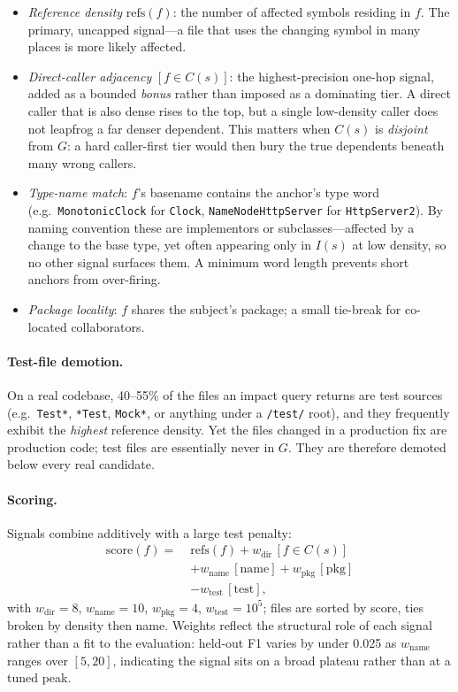 \documentclass[11pt,twocolumn]{article}
\begin{document}
\begin{itemize}
  \item \emph{Reference density} $\mathrm{refs}(f)$: the number of affected symbols residing in
  $f$. The primary, uncapped signal---a file that uses the changing symbol in many places is more
  likely affected.
  \item \emph{Direct-caller adjacency} $[f\in C(s)]$: the highest-precision one-hop signal, added
  as a bounded \emph{bonus} rather than imposed as a dominating tier. A direct caller that is also
  dense rises to the top, but a single low-density caller does not leapfrog a far denser
  dependent. This matters when $C(s)$ is \emph{disjoint} from $G$: a hard caller-first tier would
  then bury the true dependents beneath many wrong callers.
  \item \emph{Type-name match}: $f$'s basename contains the anchor's type word (e.g.\
  \texttt{MonotonicClock} for \texttt{Clock}, \texttt{NameNodeHttpServer} for
  \texttt{HttpServer2}). By naming convention these are implementors or subclasses---affected by a
  change to the base type, yet often appearing only in $I(s)$ at low density, so no other signal
  surfaces them. A minimum word length prevents short anchors from over-firing.
  \item \emph{Package locality}: $f$ shares the subject's package; a small tie-break for
  co-located collaborators.
\end{itemize}

\paragraph{Test-file demotion.} On a real codebase, 40--55\% of the files an impact query returns
are test sources (e.g.\ \texttt{Test*}, \texttt{*Test}, \texttt{Mock*}, or anything under a
\texttt{/test/} root), and they frequently exhibit the \emph{highest} reference density. Yet the
files changed in a production fix are production code; test files are essentially never in $G$.
They are therefore demoted below every real candidate.

\paragraph{Scoring.} Signals combine additively with a large test penalty:
\begin{align*}
\mathrm{score}(f) =\;& \mathrm{refs}(f)
  + w_{\mathrm{dir}}\,[f\!\in\!C(s)]\\
  &+ w_{\mathrm{name}}\,[\text{name}]
  + w_{\mathrm{pkg}}\,[\text{pkg}]\\
  &- w_{\mathrm{test}}\,[\text{test}],
\end{align*}
with $w_{\mathrm{dir}}{=}8$, $w_{\mathrm{name}}{=}10$, $w_{\mathrm{pkg}}{=}4$,
$w_{\mathrm{test}}{=}10^5$; files are sorted by score, ties broken by density then name. Weights
reflect the structural role of each signal rather than a fit to the evaluation: held-out F1
varies by under 0.025 as $w_{\mathrm{name}}$ ranges over $[5,20]$, indicating the signal sits on
a broad plateau rather than at a tuned peak.
\end{document}
